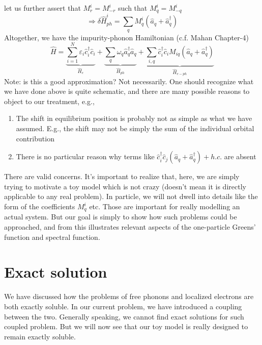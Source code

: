 let us further assert that $M_{r}^{i}=M_{-r}^{i}$ such that $M_{q}^{i}=M_{-q}^{i}$
\[ \Rightarrow \delta \hat{H}_{ph}^{i}=\sum_q{M_{q}^{i}\left( \hat{a}_q+\hat{a}_{q}^{\dagger} \right)}\]
Altogether, we have the impurity-phonon Hamiltonian (c.f. Mahan Chapter-4)
\[ \hat{H}=\underset{\hat{H}_e}{\underbrace{\sum_{i=1}^N{\varepsilon _i\hat{c}_{i}^{\dagger}\hat{c}_i}}}+\underset{\hat{H}_{ph}}{\underbrace{\sum_q{\omega _q\hat{a}_{q}^{\dagger}\hat{a}_q}}}+\underset{\hat{H}_{e-ph}}{\underbrace{\sum_{i,q}{\hat{c}_{i}^{\dagger}\hat{c}_iM_{iq}\left( \hat{a}_q+\hat{a}_{q}^{\dagger} \right)}}}\]
Note: is this a good approximation? Not necessarily. One should recognize what we have done above is quite schematic, and there are many possible reasons to object to our treatment, e.g.,
\begin{enumerate}
    \item The shift in equilibrium position is probably not as simple as what we have assumed. E.g., the shift may not be simply the sum of the individual orbital contribution
    \item There is no particular reason why terms like $\hat{c}_{i}^{\dagger}\hat{c}_j\left( \hat{a}_q+\hat{a}_{q}^{\dagger} \right) +h.c.$ are absent
\end{enumerate}

There are valid concerns. It's important to realize that, here, we are simply trying to motivate a toy model which is not crazy (doesn't mean it is directly applicable to any real problem). In particle, we will not dwell into details like the form of the coefficients $M_q^i$ etc. Those are important for really modelling an actual system. But our goal is simply to show how such problems could be approached, and from this illustrates relevant aspects of the one-particle Greens' function and spectral function.

\section{Exact solution}

We have discussed how the problems of free phonons and localized electrons are both exactly soluble. In our current problem, we have introduced a coupling between the two. Generally speaking, we cannot find exact solutions for such coupled problem. But we will now see that our toy model is really designed to remain exactly soluble.

